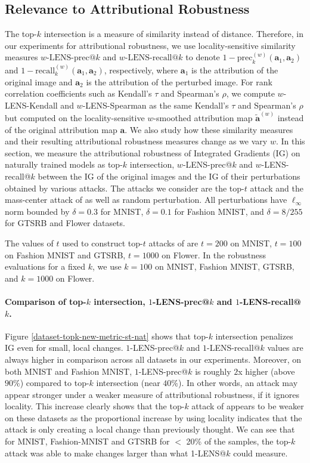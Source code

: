\documentclass[letterpaper]{article} %
\def\ba{\mathbf{a}}
\begin{document}
\subsection{Relevance to Attributional Robustness} \label{subsec:lens-relevance-robustness}
The top-$k$ intersection is a measure of similarity instead of distance. Therefore, in our experiments for attributional robustness, we use locality-sensitive similarity measures $w\text{-LENS-prec@}k$ and $w\text{-LENS-recall@}k$ to denote $1 - \text{prec}_{k}^{(w)}(\ba_{1}, \ba_{2})$ and $1 - \text{recall}_{k}^{(w)}(\ba_{1}, \ba_{2})$, respectively, where $\ba_{1}$ is the attribution of the original image and $\ba_{2}$ is the attribution of the perturbed image. For rank correlation coefficients such as Kendall's $\tau$ and Spearman's $\rho$, we compute $w$-LENS-Kendall and $w$-LENS-Spearman as the same Kendall's $\tau$ and Spearman's $\rho$ but computed on the locality-sensitive $w$-smoothed attribution map $\tilde{\ba}^{(w)}$ instead of the original attribution map $\ba$. We also study how these similarity measures and their resulting attributional robustness measures change as we vary $w$.
In this section, we measure the attributional robustness of Integrated Gradients (IG) on naturally trained models as top-$k$ intersection, $w$-LENS-prec@$k$ and $w$-LENS-recall@$k$ between the IG of the original images and the IG of their perturbations obtained by various attacks. The attacks we consider are the top-$t$ attack and the mass-center attack of \citet{ghorbani2018interpretation} as well as random perturbation. All perturbations have $\ell_{\infty}$ norm bounded by $\delta=0.3$ for MNIST, $\delta=0.1$ for Fashion MNIST, and $\delta=8/255$ for GTSRB and Flower datasets.

The values of $t$ used to construct top-$t$ attacks of \citet{ghorbani2018interpretation} are $t=200$ on MNIST, $t=100$ on Fashion MNIST and GTSRB, $t=1000$ on Flower. In the robustness evaluations for a fixed $k$, we use $k=100$ on MNIST, Fashion MNIST, GTSRB, and $k=1000$ on Flower.

\paragraph{Comparison of top-$k$ intersection, $1$-LENS-prec@$k$ and $1$-LENS-recall@$k$.}
Figure \ref{dataset-topk-new-metric-st-nat} shows that top-$k$ intersection penalizes IG even for small, local changes. $1$-LENS-prec@$k$ and $1$-LENS-recall@$k$ values are always higher in comparison across all datasets in our experiments. Moreover, on both MNIST and Fashion MNIST, $1$-LENS-prec@$k$ is roughly $2$x higher (above $90\%$) compared to top-$k$ intersection (near $40\%$). In other words, an attack may appear stronger under a weaker measure of attributional robustness, if it ignores locality. This increase clearly shows that the top-$k$ attack of \citet{ghorbani2018interpretation} appears to be weaker on these datasets as the proportional increase by using locality indicates that the attack is only creating a local change than previously thought. We can see that for MNIST, Fashion-MNIST and GTSRB for $<$ 20\% of the samples, the top-$k$ attack was able to make changes larger than what 1-LENS@$k$ could measure.
\end{document}
